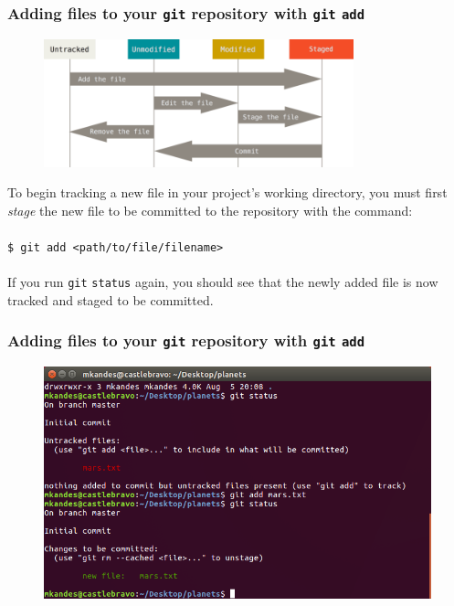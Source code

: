 \documentclass{beamer}
\begin{document}
\begin{frame}
   \frametitle{Adding files to your \texttt{git} repository with \texttt{git} \texttt{add}}
   \begin{figure}[htbp]
      \includegraphics[width=0.8\textwidth]{images/git-file-lifecycle.png}
   \end{figure}
   To begin tracking a new file in your project's working directory, you 
   must first \textit{stage} the new file to be committed to the 
   repository with the command:
   \\ \ \\
   \texttt{\hspace{1.0em}\$ git add <path/to/file/filename>}
   \\ \ \\
   If you run \texttt{git} \texttt{status} again, you should see that 
   the newly added file is now tracked and staged to be committed.
\end{frame}

\begin{frame}
   \frametitle{Adding files to your \texttt{git} repository with \texttt{git} \texttt{add}}
   \begin{figure}[htbp]
      \includegraphics[width=1.0\textwidth]{images/git-add.png}
   \end{figure}
\end{frame}
\end{document}
